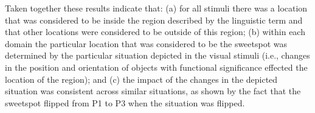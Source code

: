 \documentclass[11pt,letterpaper]{article}
\begin{document}



Taken together these results indicate that: (a) for all stimuli there was a location that was considered to be inside the region described by the linguistic term and that other locations were considered to be outside of this region; (b) within each domain the particular location that was considered to be the sweetspot was determined by the particular situation depicted in the visual stimuli (i.e., changes in the position and orientation of objects with functional significance effected the location of the region); and (c) the impact of the changes in the depicted situation was consistent across similar situations, as shown by the fact that the sweetspot flipped from P1 to P3 when the situation was flipped.
\end{document}
